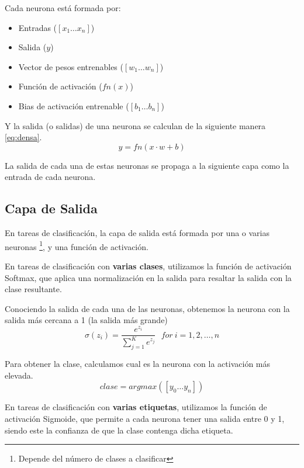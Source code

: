 Cada neurona está formada por:

\begin{itemize}
\item
  Entradas ($[x_1 \dots x_n]$)
\item
  Salida  ($y$)
\item
  Vector de pesos entrenables ($[w_1 \dots w_n]$)
\item
  Función de activación ($fn(x)$)
\item
  Bias de activación entrenable ($[b_1 \dots b_n]$)
\end{itemize}

Y la salida (o salidas) de una neurona se calculan de la siguiente manera \eqref{eq:densa}.
\begin{equation}
    \label{eq:densa}
    y = fn(x \cdot w + b)
\end{equation}

La salida de cada una de estas neuronas se propaga a la siguiente capa como la entrada de cada neurona.

\hypertarget{capa-de-salida}{%
\subsection{Capa de Salida}\label{capa-de-salida}}

En tareas de clasificación, la capa de salida está formada por una o
varias neuronas \footnote{Depende del número de clases a clasificar}, y una función de
activación.

En tareas de clasificación con \textbf{varias clases}, utilizamos la
función de activación Softmax, que aplica una normalización en la salida
para resaltar la salida con la clase resultante.

Conociendo la salida de cada una de las neuronas, obtenemos la neurona
con la salida más cercana a 1 (la salida más grande)
\begin{equation}
   \sigma(z_i) = \frac{e^{z_{i}}}{\sum_{j=1}^K e^{z_{j}}} \ \ \ for\ i=1,2,\dots,n
   \label{eq:softmax}
\end{equation}



Para obtener la clase, calculamos cual es la neurona con la activación más elevada.
\begin{equation}
    clase = argmax([y_0 \dots y_n])

\end{equation}



En tareas de clasificación con \textbf{varias etiquetas}, utilizamos la
función de activación Sigmoide, que permite a cada neurona tener una
salida entre 0 y 1, siendo este la confianza de que la clase contenga
dicha etiqueta.

